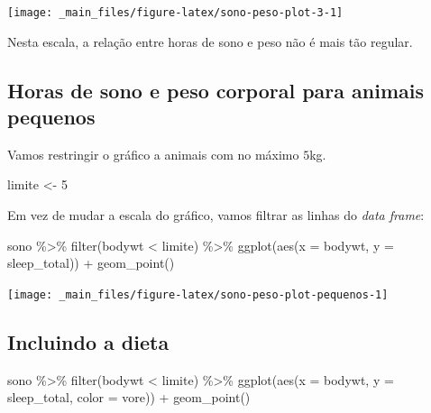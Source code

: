 \documentclass[
  11pt]{report}
\newenvironment{Shaded}{\begin{snugshade}}{\end{snugshade}}
\newcommand{\AttributeTok}[1]{\textcolor[rgb]{0.77,0.63,0.00}{#1}}
\newcommand{\DecValTok}[1]{\textcolor[rgb]{0.00,0.00,0.81}{#1}}
\newcommand{\FunctionTok}[1]{\textcolor[rgb]{0.00,0.00,0.00}{#1}}
\newcommand{\NormalTok}[1]{#1}
\newcommand{\OtherTok}[1]{\textcolor[rgb]{0.56,0.35,0.01}{#1}}
\newcommand{\SpecialCharTok}[1]{\textcolor[rgb]{0.00,0.00,0.00}{#1}}
\begin{document}
\begin{center}\texttt{[image: \_main\_files/figure-latex/sono-peso-plot-3-1]} \end{center}

Nesta escala, a relação entre horas de sono e peso não é mais tão regular.

\hypertarget{horas-de-sono-e-peso-corporal-para-animais-pequenos}{%
\subsection{Horas de sono e peso corporal para animais pequenos}\label{horas-de-sono-e-peso-corporal-para-animais-pequenos}}

Vamos restringir o gráfico a animais com no máximo \(5\)kg.

\begin{Shaded}
\begin{Highlighting}[]
\NormalTok{limite }\OtherTok{\textless{}{-}} \DecValTok{5}
\end{Highlighting}
\end{Shaded}

Em vez de mudar a escala do gráfico, vamos filtrar as linhas do \emph{data frame}:

\begin{Shaded}
\begin{Highlighting}[]
\NormalTok{sono }\SpecialCharTok{\%\textgreater{}\%} 
  \FunctionTok{filter}\NormalTok{(bodywt }\SpecialCharTok{\textless{}}\NormalTok{ limite) }\SpecialCharTok{\%\textgreater{}\%} 
  \FunctionTok{ggplot}\NormalTok{(}\FunctionTok{aes}\NormalTok{(}\AttributeTok{x =}\NormalTok{ bodywt, }\AttributeTok{y =}\NormalTok{ sleep\_total)) }\SpecialCharTok{+}
    \FunctionTok{geom\_point}\NormalTok{()}
\end{Highlighting}
\end{Shaded}

\begin{center}\texttt{[image: \_main\_files/figure-latex/sono-peso-plot-pequenos-1]} \end{center}

\hypertarget{incluindo-a-dieta}{%
\subsection{Incluindo a dieta}\label{incluindo-a-dieta}}

\begin{Shaded}
\begin{Highlighting}[]
\NormalTok{sono }\SpecialCharTok{\%\textgreater{}\%} 
  \FunctionTok{filter}\NormalTok{(bodywt }\SpecialCharTok{\textless{}}\NormalTok{ limite) }\SpecialCharTok{\%\textgreater{}\%} 
  \FunctionTok{ggplot}\NormalTok{(}\FunctionTok{aes}\NormalTok{(}\AttributeTok{x =}\NormalTok{ bodywt, }\AttributeTok{y =}\NormalTok{ sleep\_total, }\AttributeTok{color =}\NormalTok{ vore)) }\SpecialCharTok{+}
    \FunctionTok{geom\_point}\NormalTok{()}
\end{Highlighting}
\end{Shaded}
\end{document}

